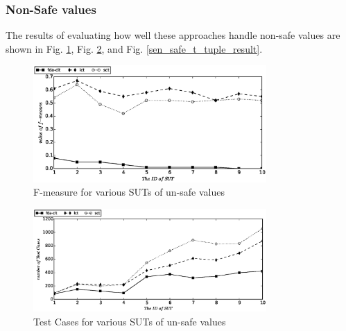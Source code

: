 \documentclass[journal,12pt,onecolumn,draftclsnofoot,]{IEEEtran}
\begin{document}






\subsubsection{Non-Safe values}

The results of evaluating how well these approaches handle non-safe values are shown in Fig. \ref{sen_safe_f_measure_result}, Fig. \ref{sen_safe_tests_result}, and Fig. \ref{sen_safe_t_tuple_result}.

\begin{figure}[htbp]
 \includegraphics[width=3.5in]{sen_safe_f_measure.eps}
\caption{F-measure for various SUTs of un-safe values}
\label{sen_safe_f_measure_result}
\end{figure}


\begin{figure}[htbp]
 \includegraphics[width=3.5in]{sen_safe_tests.eps}
\caption{Test Cases for various SUTs of un-safe values}
\label{sen_safe_tests_result}
\end{figure}
\end{document}
